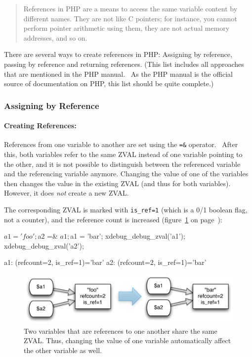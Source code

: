 \begin{quote}
References in PHP are a means to access the same variable content by different names. They are not like C pointers; for instance, you cannot perform pointer arithmetic using them, they are not actual memory addresses, and so on.
\end{quote}

There are several ways to create references in PHP: Assigning by reference, passing by reference and returning references. (This list includes all approaches that are mentioned in the PHP manual.~\cite{php-manual-references} As the PHP manual is the official source of documentation on PHP, this list should be quite complete.)


\subsubsection{Assigning by Reference}

\paragraph{Creating References:}

References from one variable to another are set using the \texttt{=\&} operator.~\cite[page 129]{wenz-php53}\cite{php-manual-what-references-do} After this, both variables refer to the same ZVAL instead of one variable pointing to the other, and it is not possible to distinguish between the referenced variable and the referencing variable anymore. Changing the value of one of the variables then changes the value in the existing ZVAL (and thus for both variables). However, it does \emph{not} create a new ZVAL.

The corresponding ZVAL is marked with \texttt{is\_ref=1} (which is a 0/1 boolean flag, not a counter), and the reference count is increased (figure~\ref{fig:simple-reference} on page~\pageref{fig:simple-reference}):

\begin{phpcode}
$a1 = 'foo';
$a2 =& $a1;
$a1 = 'bar';
xdebug_debug_zval('a1');
xdebug_debug_zval('a2');
\end{phpcode}

\begin{textcode}
a1: (refcount=2, is_ref=1)='bar'
a2: (refcount=2, is_ref=1)='bar'
\end{textcode}

\begin{figure}[htb]
  \begin{center}
    \includegraphics[scale=0.8]{images/a1_a2}
    \caption{Two variables that are references to one another share the same ZVAL. Thus, changing the value of one variable automatically affect the other variable as well.}
    \label{fig:simple-reference}
  \end{center}
\end{figure}


